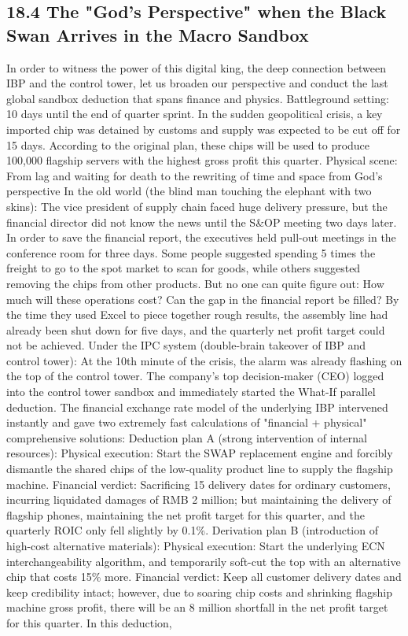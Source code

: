 \documentclass[11pt,a4paper]{article}
\begin{document}
\subsection*{18.4 The "God's Perspective" when the Black Swan Arrives in the Macro Sandbox}


In order to witness the power of this digital king, the deep connection between IBP and the control tower, let us broaden our perspective and conduct the last global sandbox deduction that spans finance and physics. Battleground setting: 10 days until the end of quarter sprint. In the sudden geopolitical crisis, a key imported chip was detained by customs and supply was expected to be cut off for 15 days. According to the original plan, these chips will be used to produce 100,000 flagship servers with the highest gross profit this quarter. Physical scene: From lag and waiting for death to the rewriting of time and space from God’s perspective In the old world (the blind man touching the elephant with two skins): The vice president of supply chain faced huge delivery pressure, but the financial director did not know the news until the S\&OP meeting two days later. In order to save the financial report, the executives held pull-out meetings in the conference room for three days. Some people suggested spending 5 times the freight to go to the spot market to scan for goods, while others suggested removing the chips from other products. But no one can quite figure out: How much will these operations cost? Can the gap in the financial report be filled? By the time they used Excel to piece together rough results, the assembly line had already been shut down for five days, and the quarterly net profit target could not be achieved. Under the IPC system (double-brain takeover of IBP and control tower): At the 10th minute of the crisis, the alarm was already flashing on the top of the control tower. The company's top decision-maker (CEO) logged into the control tower sandbox and immediately started the What-If parallel deduction. The financial exchange rate model of the underlying IBP intervened instantly and gave two extremely fast calculations of "financial + physical" comprehensive solutions: Deduction plan A (strong intervention of internal resources): Physical execution: Start the SWAP replacement engine and forcibly dismantle the shared chips of the low-quality product line to supply the flagship machine. Financial verdict: Sacrificing 15 delivery dates for ordinary customers, incurring liquidated damages of RMB 2 million; but maintaining the delivery of flagship phones, maintaining the net profit target for this quarter, and the quarterly ROIC only fell slightly by 0.1\%. Derivation plan B (introduction of high-cost alternative materials): Physical execution: Start the underlying ECN interchangeability algorithm, and temporarily soft-cut the top with an alternative chip that costs 15\% more. Financial verdict: Keep all customer delivery dates and keep credibility intact; however, due to soaring chip costs and shrinking flagship machine gross profit, there will be an 8 million shortfall in the net profit target for this quarter. In this deduction, 
\end{document}
